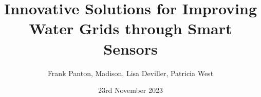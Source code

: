 % 

% 

\setlength{\droptitle}{-8em} %

\title{\textbf{Innovative Solutions for Improving Water Grids through Smart Sensors}}
\author{Frank Panton, Madison, Lisa Deviller, Patricia West}
\date{23rd November 2023}
\maketitle
\tableofcontents
% 
% 